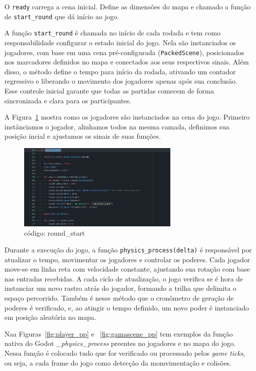O \texttt{ready} carrega a cena inicial. Define as dimensões do mapa e chamado a função de \texttt{start\_round} que dá início ao jogo.

A função \texttt{start\_round} é chamada no início de cada rodada e tem como responsabilidade configurar o estado inicial do jogo. Nela são instanciados os jogadores, com base em uma cena pré-configurada (\texttt{PackedScene}), posicionados nos marcadores definidos no mapa e conectados aos seus respectivos sinais. Além disso, o método define o tempo para início da rodada, ativando um contador regressivo e liberando o movimento dos jogadores apenas após sua conclusão. Esse controle inicial garante que todas as partidas comecem de forma sincronizada e clara para os participantes.

A Figura~\ref{fig:round_start} mostra como os jogadores são instanciados na cena do jogo. Primeiro instânciamos o jogador, alinhamos todos na mesma camada, definimos sua posição incial e ajustamos os sinais de suas funções.

\begin{figure}[htbp]
    \centering
    \caption{código: round\_start}
    \label{fig:round_start}
    \includegraphics[width=0.7\textwidth]{figuras/round_start.png}
\end{figure}

Durante a execução do jogo, a função \texttt{physics\_process(delta)} é responsável por atualizar o tempo, movimentar os jogadores e controlar os poderes. Cada jogador move-se em linha reta com velocidade constante, ajustando sua rotação com base nas entradas recebidas. A cada ciclo de atualização, o jogo verifica se é hora de instanciar um novo rastro atrás do jogador, formando a trilha que delimita o espaço percorrido. Também é nesse método que o cronômetro de geração de poderes é verificado, e, ao atingir o tempo definido, um novo poder é instanciado em posição aleatória no mapa.

Naa Figuras~\ref{fig:player_pp} e ~\ref{fig:gamascene_pp} tem exemplos da função nativa do Godot \textit{\_physics\_process} preentes no jogadores e no mapa do jogo. Nessa função é colocado tudo que for verificado ou processado pelos \textit{game ticks}, ou seja, a cada frame do jogo como detecção da momvimentação e colisões.


